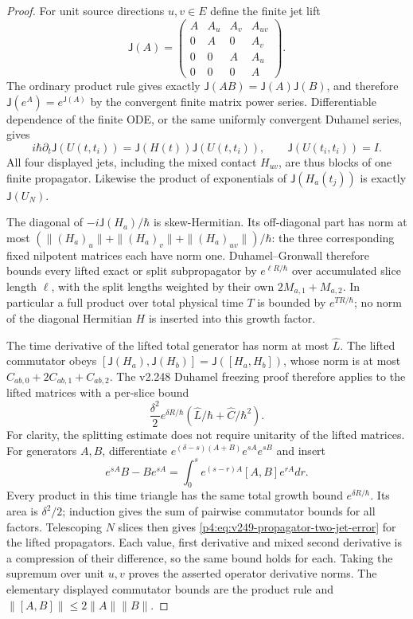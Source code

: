 \documentclass[12pt,a4paper]{article}
\begin{document}
\begin{proof}
For unit source directions $u,v\in E$ define the finite jet lift
\[
 \mathsf J(A)=
 \begin{pmatrix}
 A&A_u&A_v&A_{uv}\\
 0&A&0&A_v\\
 0&0&A&A_u\\
 0&0&0&A
 \end{pmatrix}.
\]
The ordinary product rule gives exactly
$\mathsf J(AB)=\mathsf J(A)\mathsf J(B)$, and therefore
$\mathsf J(e^A)=e^{\mathsf J(A)}$ by the convergent finite matrix power
series. Differentiable dependence of the finite ODE, or the same uniformly
convergent Duhamel series, gives
\[
 i\hbar\partial_t\mathsf J(U(t,t_i))
       =\mathsf J(H(t))\mathsf J(U(t,t_i)),
 \qquad \mathsf J(U(t_i,t_i))=I.
\]
All four displayed jets, including the mixed contact $H_{uv}$, are thus
blocks of one finite propagator. Likewise the product of exponentials of
$\mathsf J(H_a(t_j))$ is exactly $\mathsf J(U_N)$.

The diagonal of $-i\mathsf J(H_a)/\hbar$ is skew-Hermitian.
Its off-diagonal part has norm at most
$(\|(H_a)_u\|+\|(H_a)_v\|+\|(H_a)_{uv}\|)/\hbar$:
the three corresponding fixed nilpotent matrices each have norm one.
Duhamel--Gronwall therefore bounds every lifted exact or split subpropagator
by $e^{\ell R/\hbar}$ over accumulated slice length $\ell$, with the
split lengths weighted by their own $2M_{a,1}+M_{a,2}$. In particular a
full product over total physical time $T$ is bounded by $e^{TR/\hbar}$;
no norm of the diagonal Hermitian $H$ is inserted into this growth factor.

The time derivative of the lifted total generator has norm at most
$\widehat L$. The lifted commutator obeys
$[\mathsf J(H_a),\mathsf J(H_b)]=\mathsf J([H_a,H_b])$, whose norm is
at most $C_{ab,0}+2C_{ab,1}+C_{ab,2}$. The v2.248 Duhamel freezing proof
therefore applies to the lifted matrices with a per-slice bound
\[
 \frac{\delta^2}{2}e^{\delta R/\hbar}
          (\widehat L/\hbar+\widehat C/\hbar^2).
\]
For clarity, the splitting estimate does not require unitarity of the lifted
matrices. For generators $A,B$, differentiate
$e^{(\delta-s)(A+B)}e^{sA}e^{sB}$ and insert
\[
 e^{sA}B-Be^{sA}
       =\int_0^s e^{(s-r)A}[A,B]e^{rA}dr.
\]
Every product in this time triangle has the same total growth bound
$e^{\delta R/\hbar}$. Its area is $\delta^2/2$; induction gives the sum
of pairwise commutator bounds for all factors. Telescoping $N$ slices
then gives \eqref{p4:eq:v249-propagator-two-jet-error} for the lifted
propagators. Each value, first derivative and mixed second derivative
is a compression of their difference, so the same bound holds for each.
Taking the supremum over unit $u,v$ proves the asserted operator derivative
norms. The elementary displayed commutator bounds are the product rule and
$\|[A,B]\|\le2\|A\|\|B\|$.
\end{proof}
\end{document}
